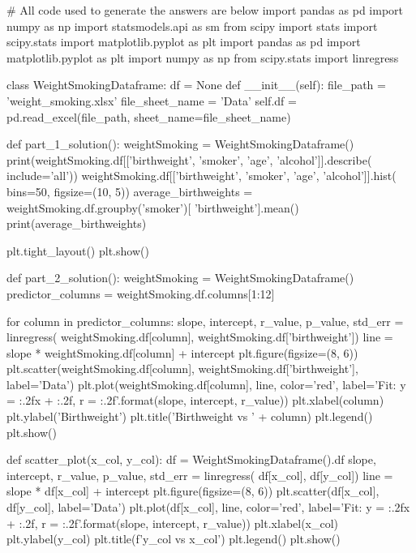 \documentclass{uofa-eng-assignment}
\begin{document}
\begin{python}
# All code used to generate the answers are below
    import pandas as pd
    import numpy as np
    import statsmodels.api as sm
    from scipy import stats
    import scipy.stats
    import matplotlib.pyplot as plt
    import pandas as pd
    import matplotlib.pyplot as plt
    import numpy as np
    from scipy.stats import linregress
    
    
    class WeightSmokingDataframe:
        df = None
        def __init__(self):
            file_path = 'weight_smoking.xlsx'
            file_sheet_name = 'Data'
            self.df = pd.read_excel(file_path, sheet_name=file_sheet_name)
    
    
    def part_1_solution():
        weightSmoking = WeightSmokingDataframe()
        print(weightSmoking.df[['birthweight', 'smoker', 'age', 'alcohol']].describe(
            include='all'))
        weightSmoking.df[['birthweight', 'smoker', 'age', 'alcohol']].hist(
            bins=50, figsize=(10, 5))
        average_birthweights = weightSmoking.df.groupby('smoker')[
            'birthweight'].mean()
        print(average_birthweights)
    
        plt.tight_layout()
        plt.show()
    
    
    def part_2_solution():
        weightSmoking = WeightSmokingDataframe()
        predictor_columns = weightSmoking.df.columns[1:12]
    
        for column in predictor_columns:
            slope, intercept, r_value, p_value, std_err = linregress(
                weightSmoking.df[column], weightSmoking.df['birthweight'])
            line = slope * weightSmoking.df[column] + intercept
            plt.figure(figsize=(8, 6))
            plt.scatter(weightSmoking.df[column],
                        weightSmoking.df['birthweight'], label='Data')
            plt.plot(weightSmoking.df[column], line, color='red',
                     label='Fit: y = {:.2f}x + {:.2f}, r = {:.2f}'.format(slope, intercept, r_value))
            plt.xlabel(column)
            plt.ylabel('Birthweight')
            plt.title('Birthweight vs ' + column)
            plt.legend()
            plt.show()
    
    
    def scatter_plot(x_col, y_col):
        df = WeightSmokingDataframe().df
        slope, intercept, r_value, p_value, std_err = linregress(
            df[x_col], df[y_col])
        line = slope * df[x_col] + intercept
        plt.figure(figsize=(8, 6))
        plt.scatter(df[x_col], df[y_col], label='Data')
        plt.plot(df[x_col], line, color='red',
                 label='Fit: y = {:.2f}x + {:.2f}, r = {:.2f}'.format(slope, intercept, r_value))
        plt.xlabel(x_col)
        plt.ylabel(y_col)
        plt.title(f'{y_col} vs {x_col}')
        plt.legend()
        plt.show()
    

\end{python}
\end{document}
